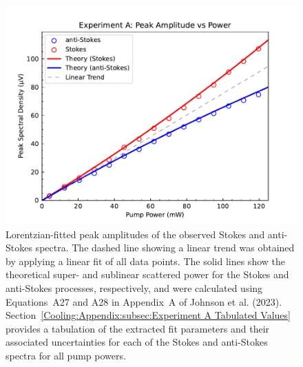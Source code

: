 \begin{figure}[t!]
  \centering
  \includegraphics[width=\textwidth]{figs/2-Cooling/P-O Heights vs Pow.pdf}
  \caption{Lorentzian-fitted peak amplitudes of the observed Stokes and anti-Stokes spectra. The dashed line showing a linear trend was obtained by applying a linear fit of all data points. The solid lines show the theoretical super- and sublinear scattered power for the Stokes and anti-Stokes processes, respectively, and were calculated using Equations~A27 and A28 in Appendix~A of Johnson et al. (2023)\cite{johnson2023laser}. Section~\ref{Cooling:Appendix:subsec:Experiment A Tabulated Values} provides a tabulation of the extracted fit parameters and their associated uncertainties for each of the Stokes and anti-Stokes spectra for all pump powers.}
  \label{fig:Cooling:P-O Heights vs Pow}
\end{figure}

